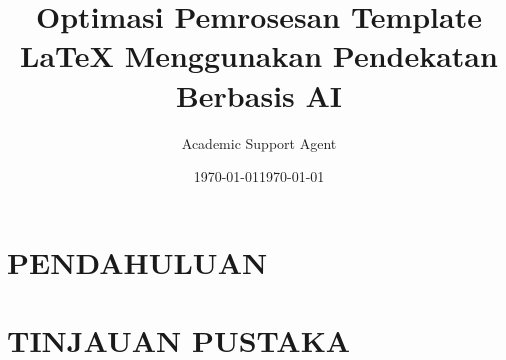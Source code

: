 \documentclass{beamer}
\title{Optimasi Pemrosesan Template LaTeX Menggunakan Pendekatan Berbasis AI}
\author{Academic Support Agent}
\date{\today}
\begin{document}
\maketitle

\begin{abstract}

\end{abstract}

\chapter{PENDAHULUAN}


\chapter{TINJAUAN PUSTAKA}



\usepackage{Handle}



\newcommand{\Title}{Title }
\newcommand{\Subtitle}{Subtitle}
\newcommand{\Institute}{Institute Name}
\newcommand{\InstituteAddress}{Institute Address}
\newcommand{\SubmittedBy}{Submitted By}
\newcommand{\SubmittedTo}{Submitted To}
\newcommand{\ImageUrl}{Images/graph.jpg}




\subject{DAA}

\small
\date{\today}
\end{document}
